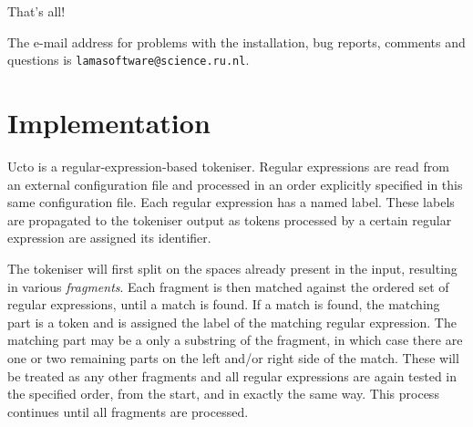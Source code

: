 \documentclass[a4paper,12pt]{report}
\begin{document}
That's all!

The e-mail address for problems with the installation, bug reports,
comments and questions is {\tt lamasoftware@science.ru.nl}.




\chapter{Implementation}
\label{implementation}

Ucto is a regular-expression-based tokeniser. Regular expressions are read from an external configuration file and processed in an order explicitly specified in this same configuration file. Each regular expression has a named label. These labels are propagated to the tokeniser output as tokens processed by a certain regular expression are assigned its identifier.

The tokeniser will first split on the spaces already present in the input, resulting in various \emph{fragments}. Each fragment is then matched against the ordered set of regular expressions, until a match is found. If a match is found, the matching part is a token and is assigned the label of the matching regular expression. The matching part may be a only a substring of the fragment, in which case there are one or two remaining parts on the left and/or right side of the match. These will be treated as any other fragments and all regular expressions are again tested in the specified order, from the start, and in exactly the same way. This process continues until all fragments are processed.
\end{document}

